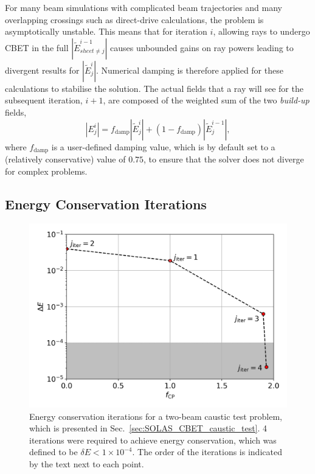 For many beam simulations with complicated beam trajectories and many overlapping crossings such as direct-drive calculations, the problem is asymptotically unstable.
This means that for iteration $i$, allowing rays to undergo \ac{CBET} in the full $|\tilde{E}_{sheet\neq j}^{i-1}|$ causes unbounded gains on ray powers leading to divergent results for $|\tilde{E}_{j}^{i}|$.
Numerical damping is therefore applied for these calculations to stabilise the solution.
The actual fields that a ray will see for the subsequent iteration, $i+1$, are composed of the weighted sum of the two \textit{build-up} fields,
\begin{equation}
    |E_{j}^{i}| = f_{\text{damp}}|\tilde{E}_{j}^{i}| + (1-f_{\text{damp}})|\tilde{E}_{j}^{i-1}|,
\end{equation}
where $f_{\text{damp}}$ is a user-defined damping value, which is by default set to a (relatively conservative) value of $0.75$, to ensure that the solver does not diverge for complex problems.

\subsection{Energy Conservation Iterations}%
\label{sec:energy_conserv_iters}

\begin{figure}[t!]
    \includegraphics[width=0.6\linewidth]{Numerics/Images/delE_minimisation.png}
    \centering
    \caption{Energy conservation iterations for a two-beam caustic test problem, which is presented in Sec.~\ref{sec:SOLAS_CBET_caustic_test}.
    4 iterations were required to achieve energy conservation, which was defined to be $\delta E<1\times 10^{-4}$.
    The order of the iterations is indicated by the text next to each point.}%
    \label{fig:SOLAS_delE_minimisation}
\end{figure}

